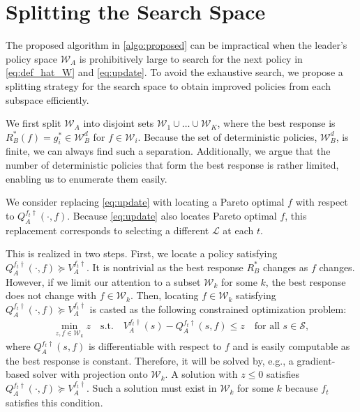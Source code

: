 \documentclass{acml}
\renewcommand{\leq}{\leqslant} %
\begin{document}
\section{Splitting the Search Space}\label{sec:improve_algo_feasibility}

The proposed algorithm in \cref{algo:proposed} can be impractical when the leader's policy space $\mathcal{W}_A$ is prohibitively large to search for the next policy in \cref{eq:def_hat_W} and \cref{eq:update}.
To avoid the exhaustive search, we propose a splitting strategy for the search space to obtain improved policies from each subspace efficiently.

We first split $\mathcal{W}_A$ into disjoint sets $\mathcal{W}_{1} \cup \dots \cup \mathcal{W}_{K}$, where the best response is $R_B^*(f) = g_i^* \in \mathcal{W}_B^d$ for $f \in \mathcal{W}_{i}$. Because the set of deterministic policies, $\mathcal{W}_B^d$, is finite, we can always find such a separation. Additionally, we argue that the number of deterministic policies that form the best response is rather limited, enabling us to enumerate them easily.

We consider replacing \eqref{eq:update} with locating a Pareto optimal $f$ with respect to $Q_A^{f_t\dagger}(\cdot, f)$. Because \eqref{eq:update} also locates Pareto optimal $f$, this replacement corresponds to selecting a different $\mathcal{L}$ at each $t$.

This is realized in two steps. First, we locate a policy satisfying $Q_A^{f_t\dagger}(\cdot, f) \succcurlyeq V_A^{f_t\dagger}$. It is nontrivial as the best response $R_B^*$ changes as $f$ changes. However, if we limit our attention to a subset $\mathcal{W}_k$ for some $k$, the best response does not change with $f \in \mathcal{W}_k$. Then, locating $f \in \mathcal{W}_k$ satisfying $Q_A^{f_t\dagger}(\cdot, f) \succcurlyeq V_A^{f_t\dagger}$ is casted as the following constrained optimization problem:
\begin{align}
\min_{z, f \in \mathcal{W}_k} z \quad \text{s.t.}\quad V_A^{f_t\dag}(s) - Q_A^{f_t\dagger}(s, f) \leq z \quad \text{for all } s \in \mathcal{S},\label{eq:practical_derivation1}
\end{align}
where $Q_A^{f_t\dagger}(s, f)$ is differentiable with respect to $f$ and is easily computable as the best response is constant. Therefore, it will be solved by, e.g., a gradient-based solver with projection onto $\mathcal{W}_k$. 
A solution with $z \le 0$ satisfies $Q_A^{f_t\dagger}(\cdot, f) \succcurlyeq V_A^{f_t\dagger}$. Such a solution must exist in $\mathcal{W}_k$ for some $k$ because $f_t$ satisfies this condition. 
\end{document}
